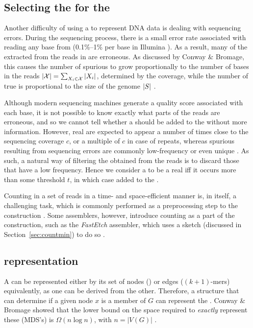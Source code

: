 \subsection{Selecting the  for the \dBG}
\label{subsec:dBG-selectingkmers}

Another difficulty of using a \dBG to represent DNA data is dealing with sequencing errors. During the sequencing process, there is a small error rate associated with reading any base from  (0.1\%--1\% per base in Illumina \cite{Metzker2010}). As a result, many of the  extracted from the reads in \readset are erroneous. As discussed by Conway \& Bromage, this causes the number of spurious  to grow proportionally to the number of bases in the reads $|\readset|=\sum_{\strname{X}_i \in \readset} |\strname{X}_i|$, determined by the coverage, while the number of true  is proportional to the size of the genome $|\strname{S}|$ \cite{Conway2011}.

Although modern sequencing machines generate a quality score associated with each base, it is not possible to know exactly what parts of the reads are erroneous, and so we cannot tell whether a \kmer should be added to the \dBG without more information. However, real  are expected to appear a number of times close to the sequencing coverage $c$, or a multiple of $c$ in case of repeats, whereas spurious  resulting from sequencing errors are commonly low-frequency or even unique \cite{Conway2011} \cite{Zhang2014} \cite{Ghosh2019}. As such, a natural way of filtering the  obtained from the reads is to discard those that have a low frequency. Hence we consider a \kmer to be a real \kmer iff it occurs more than some threshold $t$, in which case added to the \dBG.

Counting  in a set of reads in a time- and space-efficient manner is, in itself, a challenging task, which is commonly performed as a preprocessing step to the \dBG construction \cite{Zhang2014}. Some assemblers, however, introduce \kmer counting as a part of the \dBG construction, such as the \emph{FastEtch} assembler, which uses a \cm sketch (discussed in Section~\ref{sec:countmin}) to do so \cite{Ghosh2019}.

\subsection{\dBG representation}
\label{subsec:dBG-representation}

A \dBG can be represented either by its set of nodes () or edges ($(k+1)$-mers) equivalently, as one can be derived from the other. Therefore, a structure that can determine if a given node $x$ is a member of $G$ can represent the \dBG. Conway \& Bromage showed that the lower bound on the space required to \emph{exactly} represent these  (MDS's) is $\Omega(n \log n)$, with $n=|V(G)|$ \cite{Conway2011}.

